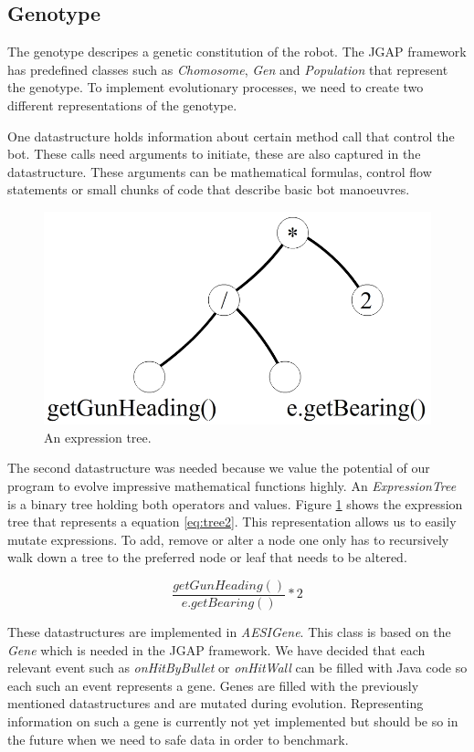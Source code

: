 \documentclass[a4paper,10pt]{article}
\begin{document}
\subsection{Genotype}
The genotype descripes a genetic constitution of the robot. The JGAP framework has predefined classes such as \textit{Chomosome}, \textit{Gen} and \textit{Population} that represent the genotype.
To implement evolutionary processes, we need to create two different representations of the genotype.

One datastructure holds information about certain method call that control the bot.
These calls need arguments to initiate, these are also captured in the datastructure. These arguments can be mathematical formulas, control flow statements or small chunks of code that describe basic bot manoeuvres.\

\begin{figure}
    \centering
    \includegraphics[scale=0.2]{tree}
    \caption{An expression tree.}
    \label{fig:tree1}
\end{figure}     

The second datastructure was needed because we value the potential of our program to evolve impressive 
mathematical functions highly. An \textit{ExpressionTree} is a binary tree holding both operators and 
values. Figure \ref{fig:tree1} shows the expression tree that represents a equation \ref{eq:tree2}. 
This representation allows us to easily mutate expressions. To add, remove or alter a node 
one only has to recursively walk down a tree to the preferred node or leaf that needs to be altered.  

\begin{equation}
    \frac{getGunHeading()}{e.getBearing()}*2
    \label{eq:tree2}
\end{equation}

These datastructures are implemented in \textit{AESIGene}. This class is based on the \textit{Gene} which is needed in the JGAP framework. We have decided that each relevant event such as \textit{onHitByBullet} or \textit{onHitWall} can be filled with Java code so each such an event represents a gene. Genes are filled with the previously mentioned datastructures and are mutated during evolution. Representing information on such a gene is currently not yet implemented but should be so in the future when we need to safe data in order to benchmark. 
 
\end{document}
